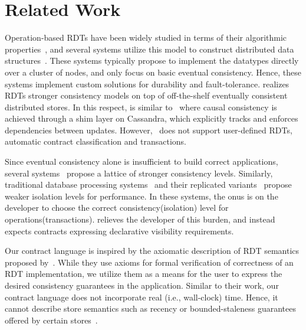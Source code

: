 \section{Related Work}
\label{sec:related}

Operation-based RDTs have been widely studied in terms of their algorithmic
properties~\cite{SSS,Burckhardt2014}, and several systems utilize this model to
construct distributed data structures~\cite{Cassandra,Bayou,Tango}. These
systems typically propose to implement the datatypes directly over a cluster of
nodes, and only focus on basic eventual consistency. Hence, these systems
implement custom solutions for durability and fault-tolerance. \name realizes
RDTs stronger consistency models on top of off-the-shelf eventually consistent
distributed stores. In this respect, \name is similar to~\cite{BoltOn} where
causal consistency is achieved through a shim layer on Cassandra, which
explicitly tracks and enforces dependencies between updates.
However,~\cite{BoltOn} does not support user-defined RDTs, automatic contract
classification and transactions.

Since eventual consistency alone is insufficient to build correct applications,
several systems~\cite{Bayou,Pileus,RedBlue} propose a lattice of stronger
consistency levels. Similarly, traditional database processing
systems~\cite{Berenson95} and their replicated variants~\cite{BailisHAT}
propose weaker isolation levels for performance. In these systems, the onus is
on the developer to choose the correct consistency(isolation) level for
operations(transactions). \name relieves the developer of this burden, and
instead expects  contracts expressing declarative visibility requirements.

Our contract language is inspired by the axiomatic description of RDT semantics
proposed by~\cite{Burckhardt2014}. While they use axioms for formal
verification of correctness of an RDT implementation, we utilize them as a
means for the user to express the desired consistency guarantees in the
application. Similar to their work, our contract language does not incorporate
real (i.e., wall-clock) time. Hence, it cannot describe store semantics such as
recency or bounded-staleness guarantees offered by certain
stores~\cite{Pileus}.

